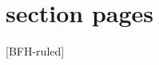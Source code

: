 \documentclass[
    ngerman,%
    authorontitle=true,
]{bfhbeamer}
\begin{document}
    \section{section pages}

    [BFH-ruled]
    \frame{\sectionpage}





\end{document}

